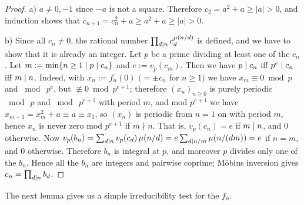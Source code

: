 \begin{proof}
  \leanok
  a) $a \ne 0, -1$ since $-a$ is not a square. Therefore $c_2 = a^2 + a \ge |a| > 0$, and
  induction shows that $c_{n+1} = c_n^2 + a \ge a^2 + a \ge |a| > 0$.

  b) Since all $c_n \ne 0$, the rational number $\prod_{d \mathrel{\mid} n} c_d^{\mu(n/d)}$ is defined, and
  we have to show that it is already an integer. Let $p$ be a prime dividing at least one of the
  $c_n$. Let $m := \min\{n \ge 1 \mid p \mathrel{\mid} c_n\}$ and $e := v_p(c_m)$. Then we have
  $p \mathrel{\mid} c_n$ iff $p^e \mathrel{\mid} c_n$ iff $m \mathrel{\mid} n$. Indeed, with $x_n := f_n(0)$ $(= \pm c_n$ for
  $n \ge 1)$ we have $x_m \equiv 0 \bmod p$ and $\bmod\ p^e$, but $\not\equiv 0 \bmod p^{e+1}$;
  therefore $(x_n)_{n \ge 0}$ is purely periodic $\bmod\ p$ and $\bmod\ p^{e+1}$ with period $m$,
  and mod $p^{e+1}$ we have $x_{m+1} = x_m^2 + a \equiv a \equiv x_1$, so $(x_n)$ is periodic
  from $n = 1$ on with period $m$, hence $x_n$ is never zero mod $p^{e+1}$ if $m \nmid n$. That
  is, $v_p(c_n) = e$ if $m \mathrel{\mid} n$, and $0$ otherwise. Now
  $v_p(b_n) = \sum_{d \mathrel{\mid} n} v_p(c_d)\,\mu(n/d) = e \sum_{d \mathrel{\mid} n/m} \mu(n/(dm)) = e$ if
  $n = m$, and $0$ otherwise. Therefore $b_n$ is integral at $p$, and moreover $p$ divides only
  one of the $b_n$. Hence all the $b_n$ are integers and pairwise coprime; Möbius inversion gives
  $c_n = \prod_{d \mathrel{\mid} n} b_d$.
\end{proof}

The next lemma gives us a simple irreducibility test for the $f_n$.

